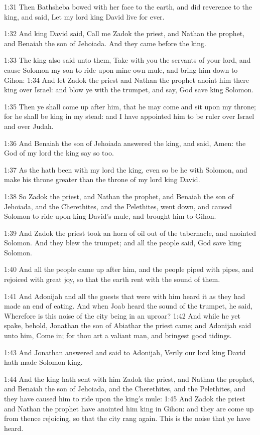 1:31 Then Bathsheba bowed with her face to the earth, and did
reverence to the king, and said, Let my lord king David live for ever.

1:32 And king David said, Call me Zadok the priest, and Nathan the
prophet, and Benaiah the son of Jehoiada. And they came before the
king.

1:33 The king also said unto them, Take with you the servants of your
lord, and cause Solomon my son to ride upon mine own mule, and bring
him down to Gihon: 1:34 And let Zadok the priest and Nathan the
prophet anoint him there king over Israel: and blow ye with the
trumpet, and say, God save king Solomon.

1:35 Then ye shall come up after him, that he may come and sit upon my
throne; for he shall be king in my stead: and I have appointed him to
be ruler over Israel and over Judah.

1:36 And Benaiah the son of Jehoiada answered the king, and said,
Amen: the \LORD God of my lord the king say so too.

1:37 As the \LORD hath been with my lord the king, even so be he with
Solomon, and make his throne greater than the throne of my lord king
David.

1:38 So Zadok the priest, and Nathan the prophet, and Benaiah the son
of Jehoiada, and the Cherethites, and the Pelethites, went down, and
caused Solomon to ride upon king David's mule, and brought him to
Gihon.

1:39 And Zadok the priest took an horn of oil out of the tabernacle,
and anointed Solomon. And they blew the trumpet; and all the people
said, God save king Solomon.

1:40 And all the people came up after him, and the people piped with
pipes, and rejoiced with great joy, so that the earth rent with the
sound of them.

1:41 And Adonijah and all the guests that were with him heard it as
they had made an end of eating. And when Joab heard the sound of the
trumpet, he said, Wherefore is this noise of the city being in an
uproar?  1:42 And while he yet spake, behold, Jonathan the son of
Abiathar the priest came; and Adonijah said unto him, Come in; for
thou art a valiant man, and bringest good tidings.

1:43 And Jonathan answered and said to Adonijah, Verily our lord king
David hath made Solomon king.

1:44 And the king hath sent with him Zadok the priest, and Nathan the
prophet, and Benaiah the son of Jehoiada, and the Cherethites, and the
Pelethites, and they have caused him to ride upon the king's mule:
1:45 And Zadok the priest and Nathan the prophet have anointed him
king in Gihon: and they are come up from thence rejoicing, so that the
city rang again. This is the noise that ye have heard.

